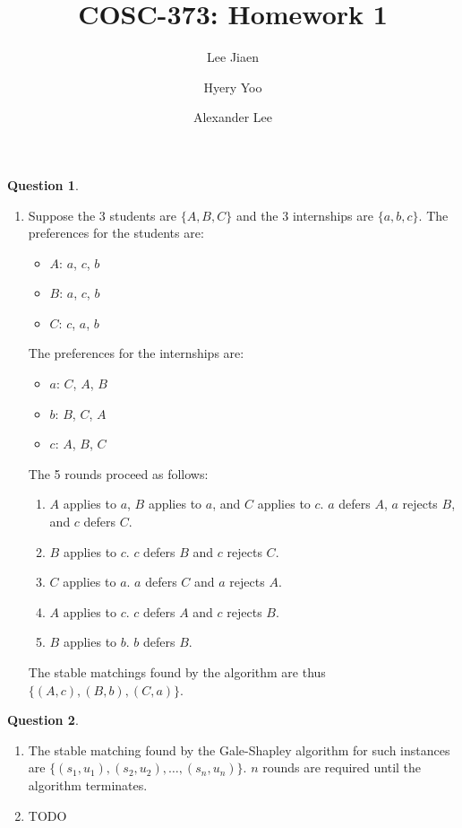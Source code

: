 \documentclass{amsart}
\title{COSC-373: Homework 1}
\author{Lee Jiaen}
\author{Hyery Yoo}
\author{Alexander Lee}
\theoremstyle{definition}
\newtheorem{question}{Question}
\begin{document}
\maketitle

\begin{question}
  \begin{enumerate}[label={(\alph*)}]
    \item Suppose the 3 students are $\{A, B, C\}$ and the 3 internships are
      $\{a, b, c\}$. The preferences for the students are:
      \begin{itemize}
        \item $A$: $a$, $c$, $b$
        \item $B$: $a$, $c$, $b$
        \item $C$: $c$, $a$, $b$
      \end{itemize}
      The preferences for the internships are:
      \begin{itemize}
        \item $a$: $C$, $A$, $B$
        \item $b$: $B$, $C$, $A$
        \item $c$: $A$, $B$, $C$
      \end{itemize}
      The 5 rounds proceed as follows:
      \begin{enumerate}[label={(\arabic*)}]
        \item $A$ applies to $a$, $B$ applies to $a$, and $C$ applies to $c$.
          $a$ defers $A$, $a$ rejects $B$, and $c$ defers $C$.
        \item $B$ applies to $c$. $c$ defers $B$ and $c$ rejects $C$.
        \item $C$ applies to $a$. $a$ defers $C$ and $a$ rejects $A$.
        \item $A$ applies to $c$. $c$ defers $A$ and $c$ rejects $B$.
        \item $B$ applies to $b$. $b$ defers $B$.
      \end{enumerate}
      The stable matchings found by the algorithm are thus $\{(A, c), (B, b),
      (C, a)\}$.
  \end{enumerate}
\end{question}

\begin{question}
  \begin{enumerate}[label={(\alph*)}]
    \item The stable matching found by the Gale-Shapley algorithm for such
      instances are $\{(s_1, u_1), (s_2, u_2), \ldots, (s_n, u_n)\}$. $n$ rounds
      are required until the algorithm terminates.
    \item TODO
  \end{enumerate}
\end{question}
\end{document}
